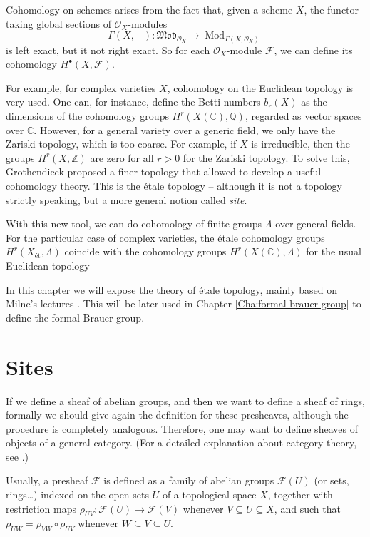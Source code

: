 \documentclass{report}
\DeclareMathOperator{\Mod}{Mod}
\theoremstyle{definition}
\begin{document}
Cohomology on schemes arises from the fact that, given a scheme $X$, the functor taking global sections of $\mathcal{O}_X$-modules
\[\Gamma(X,-):\mathfrak{Mod}_{\mathcal{O}_X}\longrightarrow\Mod_{\Gamma(X,\mathcal{O}_X)}\]
is left exact, but it not right exact. So for each $\mathcal{O}_X$-module $\mathcal{F}$, we can define its cohomology $H^{\bullet}(X,\mathcal{F})$.

For example, for complex varieties $X$, cohomology on the Euclidean topology is very used. One can, for instance, define the Betti numbers $b_r(X)$ as the dimensions of the cohomology groups $H^r(X(\mathbb{C}),\mathbb{Q})$, regarded as vector spaces over $\mathbb{C}$. However, for a general variety over a generic field, we only have the Zariski topology, which is too coarse. For example, if $X$ is irreducible, then the groups $H^r(X,\mathbb{Z})$ are zero for all $r>0$ for the Zariski topology. To solve this, Grothendieck proposed a finer topology that allowed to develop a useful cohomology theory. This is the \'{e}tale topology -- although it is not a topology strictly speaking, but a more general notion called \emph{site}.

With this new tool, we can do cohomology of finite groups $\Lambda$ over general fields. For the particular case of complex varieties, the \'{e}tale cohomology groups $H^r(X_{\text{\'{e}t}},\Lambda)$ coincide with the cohomology groups $H^r(X(\mathbb{C}),\Lambda)$ for the usual Euclidean topology

In this chapter we will expose the theory of \'{e}tale topology, mainly based on Milne's lectures \cite{milne2013lectures}. This will be later used in Chapter \ref{Cha:formal-brauer-group} to define the formal Brauer group.

\section{Sites}

If we define a sheaf of abelian groups, and then we want to define a sheaf of rings, formally we should give again the definition for these presheaves, although the procedure is completely analogous. Therefore, one may want to define sheaves of objects of a general category. (For a detailed explanation about category theory, see \cite{maclane1971categories}.)

Usually, a presheaf $\mathcal{F}$ is defined as a family of abelian groups $\mathcal{F}(U)$ (or sets, rings\ldots) indexed on the open sets $U$ of a topological space $X$, together with restriction maps $\rho_{UV}:\mathcal{F}(U)\rightarrow\mathcal{F}(V)$ whenever $V\subseteq U\subseteq X$, and such that $\rho_{UW}=\rho_{VW}\circ\rho_{UV}$ whenever $W\subseteq V\subseteq U$.
\end{document}
